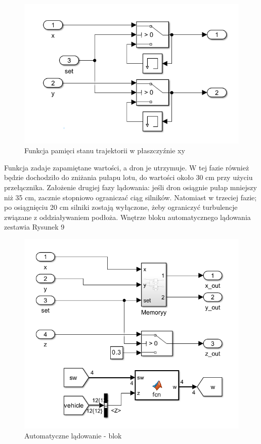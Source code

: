 \documentclass[polish,11pt,a4paper]{article}
\begin{document}
\begin{figure}[ht]
    \centering
    \includegraphics[width=1\linewidth]{lądowanie/set.png}
    \caption{Funkcja pamięci stanu trajektorii w płaszczyźnie xy}
    \label{fig:enter-label}

\end{figure}

Funkcja zadaje zapamiętane wartości, a dron je utrzymuje. W tej fazie również będzie dochodziło
do zniżania pułapu lotu, do wartości około 30 cm przy użyciu przełącznika. Założenie drugiej fazy
lądowania: jeśli dron osiągnie pułap mniejszy niż 35 cm, zacznie stopniowo ograniczać ciąg silników. Natomiast
w trzeciej fazie; po osiągnięciu 20 cm silniki zostają wyłączone, żeby ograniczyć turbulencje związane z
oddziaływaniem podłoża. Wnętrze bloku automatycznego lądowania zestawia Rysunek 9

\begin{figure}[ht]
    \centering
    \includegraphics[width=0.65\linewidth]{lądowanie/lond.png}
    \caption{Automatyczne lądowanie - blok}
    \label{fig:enter-label}

\end{figure}
\end{document}
